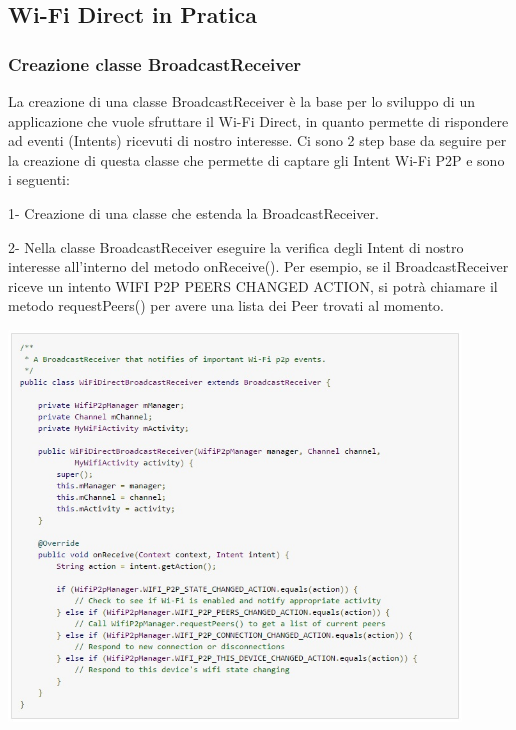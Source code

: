 \subsection{Wi-Fi Direct in Pratica}

\subsubsection{Creazione classe BroadcastReceiver}

La creazione di una classe BroadcastReceiver è la base per lo sviluppo di un applicazione che vuole sfruttare il Wi-Fi Direct, in quanto permette di rispondere ad eventi (Intents) ricevuti di nostro interesse.
Ci sono 2 step base da seguire per la creazione di questa classe che permette di captare gli Intent Wi-Fi P2P e sono i seguenti:

1- Creazione di una classe che estenda la BroadcastReceiver.

2- Nella classe BroadcastReceiver eseguire la verifica degli Intent di nostro interesse all'interno del metodo       onReceive().
   Per esempio, se il BroadcastReceiver riceve un intento WIFI P2P PEERS CHANGED ACTION, si potrà chiamare il        metodo requestPeers() per avere una lista dei Peer trovati al momento.

   

\begin{center}
\includegraphics[width=0.9\textwidth]{imgs/broadcastreceiver.jpg}
\label{broadcastreceiver_img}%
\end{center}

